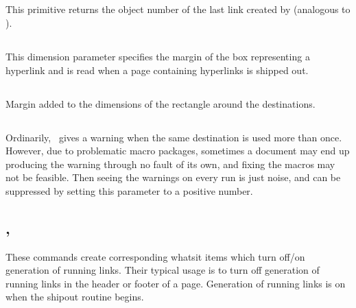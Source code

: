 \documentclass{pdftexmanual}
\begin{document}
\subsection{}

This primitive returns the object number of the last link created by
 (analogous to ).

\subsection{}

This dimension parameter specifies the margin of the box representing
a hyperlink and is read when a page containing hyperlinks is shipped out.

\subsection{}

Margin added to the dimensions of the rectangle around the destinations.

\subsection{}

Ordinarily, \PDFTEX\ gives a warning when the same destination is used
more than once. However, due to problematic macro packages, sometimes a
document may end up producing the warning through no fault of its own,
and fixing the macros may not be feasible. Then seeing the warnings on
every run is just noise, and can be suppressed by setting this parameter
to a positive number. 

\subsection{, }

These commands create corresponding whatsit items which turn off/on
generation of running links. Their typical usage is to turn off
generation of running links in the header or footer of a page.
Generation of running links is on when the shipout routine begins.
\end{document}
